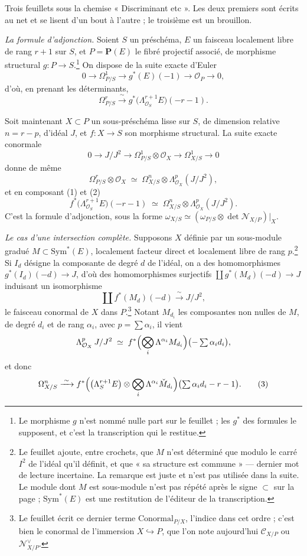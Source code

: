 \documentclass[11pt,a4paper]{article}
\begin{document}
Trois feuillets sous la chemise « Discriminant etc ». Les deux premiers sont
écrits au net et se lisent d'un bout à l'autre ; le troisième est un brouillon.

\emph{La formule d'adjonction.} Soient $S$ un préschéma, $E$ un faisceau
localement libre de rang $r+1$ sur $S$, et $P = \mathbf{P}(E)$ le fibré
projectif associé, de morphisme structural $g : P \to S$.\footnote{Le morphisme
$g$ n'est nommé nulle part sur le feuillet ; les $g^{*}$ des formules le
supposent, et c'est la transcription qui le restitue.} On dispose de la suite
exacte d'Euler
\[
  0 \longrightarrow \Omega^{1}_{P/S} \longrightarrow g^{*}(E)(-1)
  \longrightarrow \mathcal{O}_{P} \longrightarrow 0 ,
\]
d'où, en prenant les déterminants,
\[
  \Omega^{r}_{P/S} \xrightarrow{\;\sim\;}
  g^{*}\bigl(\Lambda^{r+1}_{\mathcal{O}_S} E\bigr)(-r-1) .
\tag{1}
\]

Soit maintenant $X \subset P$ un sous-préschéma lisse sur $S$, de dimension
relative $n = r - p$, d'idéal $J$, et $f : X \to S$ son morphisme structural. La
suite exacte conormale
\[
  0 \longrightarrow J/J^{2} \longrightarrow \Omega^{1}_{P/S} \otimes \mathcal{O}_X
  \longrightarrow \Omega^{1}_{X/S} \longrightarrow 0
\]
donne de même
\[
  \Omega^{r}_{P/S} \otimes \mathcal{O}_X \;\simeq\;
  \Omega^{n}_{X/S} \otimes \Lambda^{p}_{\mathcal{O}_X}(J/J^{2}) ,
\tag{2}
\]
et en composant (1) et (2)
\[
  f^{*}\bigl(\Lambda^{r+1}_{\mathcal{O}_S} E\bigr)(-r-1)
  \;\simeq\; \Omega^{n}_{X/S} \otimes \Lambda^{p}_{\mathcal{O}_X}(J/J^{2}) .
\]
C'est la formule d'adjonction, sous la forme $\omega_{X/S} \simeq
(\omega_{P/S} \otimes \det \mathcal{N}_{X/P})|_X$.

\emph{Le cas d'une intersection complète.} Supposons $X$ définie par un
sous-module gradué $M \subset \mathrm{Sym}^{*}(E)$, localement facteur direct et
localement libre de rang $p$.\footnote{Le feuillet ajoute, entre crochets, que
$M$ n'est déterminé que modulo le carré $I^{2}$ de l'idéal qu'il définit, et que
« sa structure est commune » — dernier mot de lecture incertaine. La remarque
est juste et n'est pas utilisée dans la suite. Le module dont $M$ est
sous-module n'est pas répété après le signe $\subset$ sur la page ;
$\mathrm{Sym}^{*}(E)$ est une restitution de l'éditeur de la transcription.}
Si $I_d$ désigne la composante de degré $d$ de l'idéal, on a des homomorphismes
$g^{*}(I_d)(-d) \to J$, d'où des homomorphismes surjectifs $\coprod
g^{*}(M_d)(-d) \to J$ induisant un isomorphisme
\[
  \coprod f^{*}(M_d)(-d) \xrightarrow{\;\sim\;} J/J^{2} ,
\]
le faisceau conormal de $X$ dans $P$.\footnote{Le feuillet écrit ce dernier
terme $\mathrm{Conormal}_{P/X}$, l'indice dans cet ordre ; c'est bien le
conormal de l'immersion $X \hookrightarrow P$, que l'on note aujourd'hui
$\mathcal{C}_{X/P}$ ou $\mathcal{N}^{\vee}_{X/P}$.} Notant $M_{d_i}$ les
composantes non nulles de $M$, de degré $d_i$ et de rang $\alpha_i$, avec
$p = \sum \alpha_i$, il vient
\[
  \Lambda^{p}_{\mathcal{O}_X}\, J/J^{2} \;\simeq\;
  f^{*}\Bigl(\bigotimes_{i} \Lambda^{\alpha_i} M_{d_i}\Bigr)
  \bigl(-\textstyle\sum \alpha_i d_i\bigr) ,
\]
et donc
\[
  \Omega^{n}_{X/S} \xrightarrow{\;\sim\;}
  f^{*}\Bigl(\bigl(\Lambda^{r+1}_{S} E\bigr) \otimes
  \bigotimes_{i} \Lambda^{\alpha_i} \check{M}_{d_i}\Bigr)
  \bigl(\textstyle\sum \alpha_i d_i - r - 1\bigr) .
\tag{3}
\]
\end{document}
